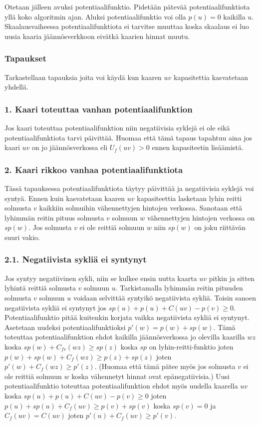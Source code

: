 \documentclass[a4paper, 11pt]{article}
\begin{document}
Otetaan jälleen avuksi potentiaalifunktio. Pidetään pätevää potentiaalifunktiota 
yllä koko algoritmin ajan. Aluksi potentiaalifunktio voi olla $p(u) = 0$ kaikilla $u$.
Skaalausvaiheessa potentiaalifunktiota ei tarvitse muuttaa koska skaalaus ei luo
uusia kaaria jäännösverkkoon eivätkä kaarien hinnat muutu.

\subsubsection*{Tapaukset}
Tarkastellaan tapauksia joita voi käydä kun kaaren $uv$ kapasitettia kasvatetaan 
yhdellä.
\subsubsection*{1. Kaari toteuttaa vanhan potentiaalifunktion}
Jos kaari toteuttaa potentiaalifunktion niin negatiivisia syklejä ei ole
eikä potentiaalifunktiota tarvi päivittää. Huomaa että tämä tapaus tapahtuu
aina jos kaari $uv$ on jo jäännösverkossa eli $U_f(uv) > 0$ ennen kapasiteetin
lisäämistä.
\subsubsection*{2. Kaari rikkoo vanhaa potentiaalifunktiota}
Tässä tapauksessa potentiaalifunktiota
täytyy päivittää ja negatiivisia syklejä voi syntyä. 
Ennen kuin kasvatetaan kaaren $uv$ kapasiteettia
lasketaan lyhin reitti solmusta $v$ kaikkiin solmuihin vähennettyjen hintojen verkossa.
Sanotaan että lyhimmän reitin pituus solmusta $v$ solmuun $w$ vähennettyjen hintojen verkossa
on $sp(w)$. Jos solmusta $v$ ei ole reittiä solmuun $w$ niin $sp(w)$ on joku riittävän
suuri vakio.
\subsubsection*{2.1. Negatiivista sykliä ei syntynyt}
Jos syntyy negatiivinen sykli, niin se kulkee ensin uutta kaarta $uv$ pitkin ja sitten
lyhintä reittiä solmusta $v$ solmuun $u$. Tarkistamalla lyhimmän reitin pituuden solmusta
$v$ solmuun $u$ voidaan selvittää syntyikö negatiivista sykliä. Toisin sanoen negatiivista
sykliä ei syntynyt jos $sp(u) + p(u) + C(uv) - p(v) \ge 0$. Potentiaalifunktio
pitää kuitenkin korjata vaikka negatiivista sykliä ei syntynyt. Asetetaan uudeksi
potentiaalifunktioksi $p'(w) = p(w) + sp(w)$. Tämä toteuttaa
potentiaalifunktion ehdot kaikilla jäännösverkossa jo olevilla kaarilla $wz$ koska 
$sp(w) + C_{fr}(wz) \ge sp(z)$ koska $sp$ on lyhin-reitti-funktio
joten $p(w) + sp(w) + C_f(wz) \ge p(z) + sp(z)$ joten $p'(w) + C_f(wz) \ge p'(z)$.
(Huomaa että tämä pätee myös jos solmusta $v$ ei ole reittiä solmuun $w$ koska vähennetyt
hinnat ovat epänegatiivisia.) Uusi potentiaalifunktio toteuttaa potentiaalifunktion
ehdot myös uudella kaarella $uv$ koska $sp(u) + p(u) + C(uv) - p(v) \ge 0$ joten
$p(u) + sp(u) + C_f(uv) \ge p(v) + sp(v)$ koska $sp(v) = 0$ ja $C_f(uv) = C(uv)$
joten $p'(u) + C_f(uv) \ge p'(v)$.
\end{document}
